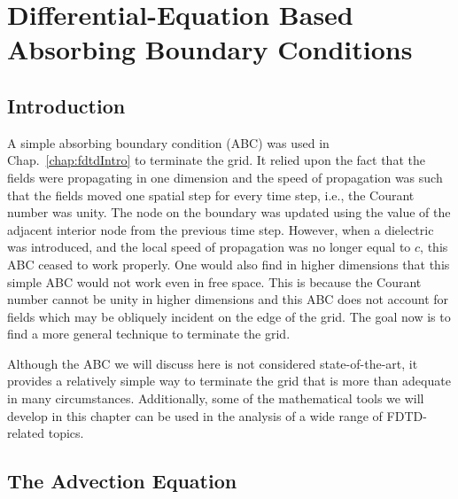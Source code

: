 \chapter[Differential-Equation Based ABC's]{Differential-Equation
Based Absorbing Boundary Conditions \label{chap:abc}}


\renewcommand{\thefootnote}{\fnsymbol{footnote}}

\section{Introduction}

A simple absorbing boundary condition (ABC) was used in Chap.\
\ref{chap:fdtdIntro} to terminate the grid.  It relied upon the fact
that the fields were propagating in one dimension and the speed of
propagation was such that the fields moved one spatial step for every
time step, i.e., the Courant number was unity.  The node on the
boundary was updated using the value of the adjacent interior node
from the previous time step.  However, when a dielectric was
introduced, and the local speed of propagation was no longer equal to
$c$, this ABC ceased to work properly.  One would also find in higher
dimensions that this simple ABC would not work even in free space.
This is because the Courant number cannot be unity in higher
dimensions and this ABC does not account for fields which may be
obliquely incident on the edge of the grid.  The goal now is to find a
more general technique to terminate the grid.

Although the ABC we will discuss here is not considered
state-of-the-art, it provides a relatively simple way to terminate the
grid that is more than adequate in many circumstances.  Additionally,
some of the mathematical tools we will develop in this chapter can be
used in the analysis of a wide range of FDTD-related topics.

\section{The Advection Equation \label{sec:advection}}

